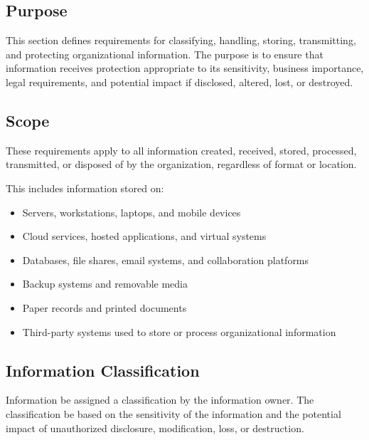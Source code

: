 \subsection{Purpose}

This section defines requirements for classifying, handling, storing, transmitting, and protecting organizational information. The purpose is to ensure that information receives protection appropriate to its sensitivity, business importance, legal requirements, and potential impact if disclosed, altered, lost, or destroyed.

\subsection{Scope}

These requirements apply to all information created, received, stored, processed, transmitted, or disposed of by the organization, regardless of format or location.

This includes information stored on:
\begin{itemize}
    \item Servers, workstations, laptops, and mobile devices
    \item Cloud services, hosted applications, and virtual systems
    \item Databases, file shares, email systems, and collaboration platforms
    \item Backup systems and removable media
    \item Paper records and printed documents
    \item Third-party systems used to store or process organizational information
\end{itemize}

\subsection{Information Classification}

Information \must{} be assigned a classification by the information owner. The classification \must{} be based on the sensitivity of the information and the potential impact of unauthorized disclosure, modification, loss, or destruction.

